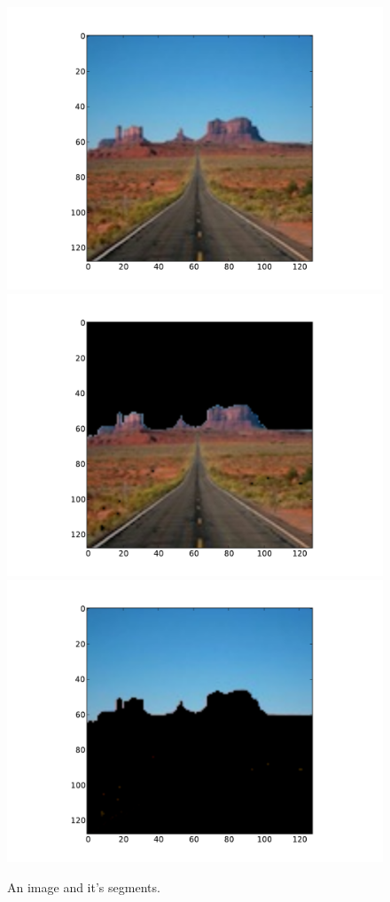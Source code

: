 \begin{figure}
\includegraphics[scale=0.2]{monument}
\includegraphics[scale=0.2]{segment1}
\includegraphics[scale=0.2]{segment2}
\caption{An image and it's segments.}
\label{segmentation:example}
\end{figure}

